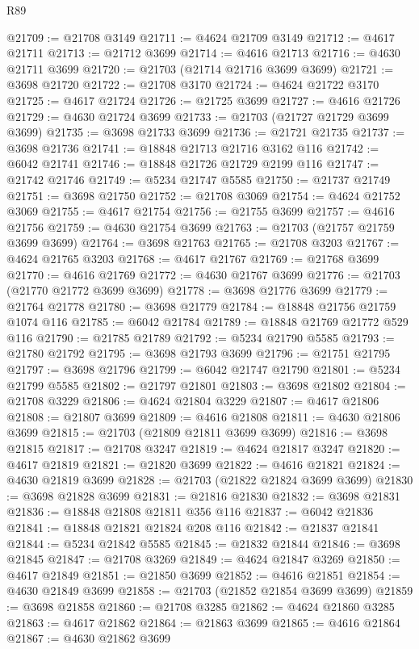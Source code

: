 \begin{lexlean}{R89}
\begin{coremodule}
@21709 := @21708 @3149
@21711 := @4624 @21709 @3149
@21712 := @4617 @21711
@21713 := @21712 @3699
@21714 := @4616 @21713
@21716 := @4630 @21711 @3699
@21720 := @21703 (@21714 @21716 @3699 @3699)
@21721 := @3698 @21720
@21722 := @21708 @3170
@21724 := @4624 @21722 @3170
@21725 := @4617 @21724
@21726 := @21725 @3699
@21727 := @4616 @21726
@21729 := @4630 @21724 @3699
@21733 := @21703 (@21727 @21729 @3699 @3699)
@21735 := @3698 @21733 @3699
@21736 := @21721 @21735
@21737 := @3698 @21736
@21741 := @18848 @21713 @21716 @3162 @116
@21742 := @6042 @21741
@21746 := @18848 @21726 @21729 @2199 @116
@21747 := @21742 @21746
@21749 := @5234 @21747 @5585
@21750 := @21737 @21749
@21751 := @3698 @21750
@21752 := @21708 @3069
@21754 := @4624 @21752 @3069
@21755 := @4617 @21754
@21756 := @21755 @3699
@21757 := @4616 @21756
@21759 := @4630 @21754 @3699
@21763 := @21703 (@21757 @21759 @3699 @3699)
@21764 := @3698 @21763
@21765 := @21708 @3203
@21767 := @4624 @21765 @3203
@21768 := @4617 @21767
@21769 := @21768 @3699
@21770 := @4616 @21769
@21772 := @4630 @21767 @3699
@21776 := @21703 (@21770 @21772 @3699 @3699)
@21778 := @3698 @21776 @3699
@21779 := @21764 @21778
@21780 := @3698 @21779
@21784 := @18848 @21756 @21759 @1074 @116
@21785 := @6042 @21784
@21789 := @18848 @21769 @21772 @529 @116
@21790 := @21785 @21789
@21792 := @5234 @21790 @5585
@21793 := @21780 @21792
@21795 := @3698 @21793 @3699
@21796 := @21751 @21795
@21797 := @3698 @21796
@21799 := @6042 @21747 @21790
@21801 := @5234 @21799 @5585
@21802 := @21797 @21801
@21803 := @3698 @21802
@21804 := @21708 @3229
@21806 := @4624 @21804 @3229
@21807 := @4617 @21806
@21808 := @21807 @3699
@21809 := @4616 @21808
@21811 := @4630 @21806 @3699
@21815 := @21703 (@21809 @21811 @3699 @3699)
@21816 := @3698 @21815
@21817 := @21708 @3247
@21819 := @4624 @21817 @3247
@21820 := @4617 @21819
@21821 := @21820 @3699
@21822 := @4616 @21821
@21824 := @4630 @21819 @3699
@21828 := @21703 (@21822 @21824 @3699 @3699)
@21830 := @3698 @21828 @3699
@21831 := @21816 @21830
@21832 := @3698 @21831
@21836 := @18848 @21808 @21811 @356 @116
@21837 := @6042 @21836
@21841 := @18848 @21821 @21824 @208 @116
@21842 := @21837 @21841
@21844 := @5234 @21842 @5585
@21845 := @21832 @21844
@21846 := @3698 @21845
@21847 := @21708 @3269
@21849 := @4624 @21847 @3269
@21850 := @4617 @21849
@21851 := @21850 @3699
@21852 := @4616 @21851
@21854 := @4630 @21849 @3699
@21858 := @21703 (@21852 @21854 @3699 @3699)
@21859 := @3698 @21858
@21860 := @21708 @3285
@21862 := @4624 @21860 @3285
@21863 := @4617 @21862
@21864 := @21863 @3699
@21865 := @4616 @21864
@21867 := @4630 @21862 @3699

\end{coremodule}
\end{lexlean}
